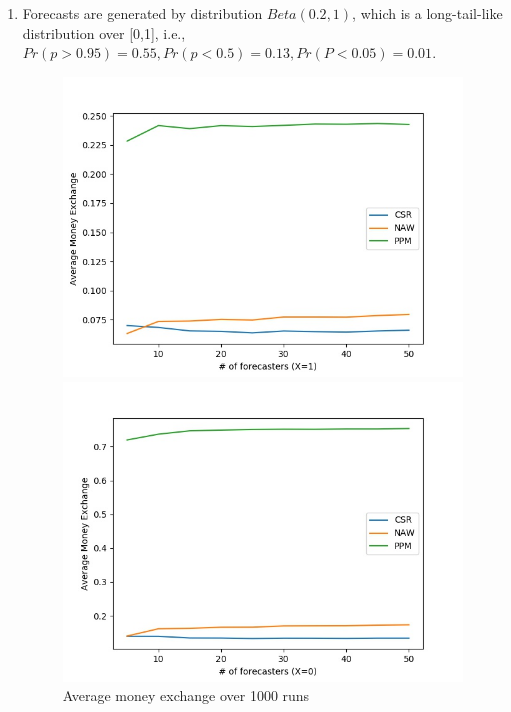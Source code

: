 \documentclass[english,10pt]{article}
\begin{document}
\begin{enumerate}
\begin{enumerate}
	\newpage
	\item Forecasts are generated by distribution $Beta(0.2, 1)$, which is a long-tail-like distribution over [0,1], i.e., $Pr(p>0.95)=0.55, Pr(p<0.5)=0.13, Pr(P<0.05)=0.01$.
	\begin{figure}[H]
        	\centering
        	\begin{minipage}{0.48\textwidth}
        	\includegraphics[width = \textwidth]{(Beta_1_0dot2)Avg_MnEx(X=1).jpg}
        	\end{minipage}
        	\begin{minipage}{0.48\textwidth}
        	\includegraphics[width = \textwidth]{(Beta_1_0dot2)Avg_MnEx(X=0).jpg}
        	\end{minipage}
        	\caption{Average money exchange over 1000 runs}
        	\end{figure}
        	

\end{enumerate}
\end{enumerate}
\end{document}
